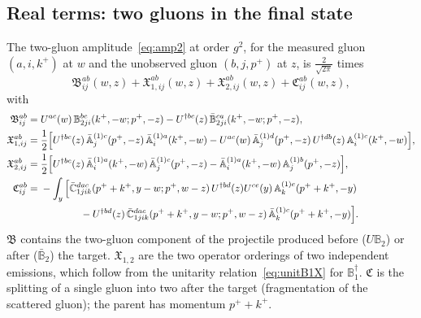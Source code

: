 \documentclass[aps,prd,onecolumn,superscriptaddress,nofootinbib,floatfix,longbibliography,11pt]{revtex4-2}
\numberwithin{equation}{section}
\def\mf#1{\mathbb{#1}}
\begin{document}
\subsection{Real terms: two gluons in the final state}\label{sec:groupII}

The two-gluon amplitude~\eqref{eq:amp2} at order $g^2$, for the measured gluon $(a,i,k^+)$ at $w$ and the unobserved gluon $(b,j,p^+)$ at $z$, is $\frac{2}{\sqrt{2\pi}}$ times
\begin{equation}
\mathfrak B^{ab}_{ij}(w,z)+\mathfrak X^{ab}_{1,ij}(w,z)+\mathfrak X^{ab}_{2,ij}(w,z)+\mathfrak C^{ab}_{ij}(w,z),
\label{eq:amp2NLO}
\end{equation}
with
\begin{align}
\mathfrak B^{ab}_{ij}={}&U^{ac}(w)\,\mf B^{bc}_{2ji}(k^+,-w;p^+,-z)-U^{\dagger bc}(z)\,\bar{\mf B}^{ca}_{2ji}(k^+,-w;p^+,-z),\label{eq:frakB}\\
\mathfrak X^{ab}_{1,ij}={}&\frac12\Big[U^{\dagger bc}(z)\,\bar{\mf A}^{(1)c}_j(p^+,-z)\,\bar{\mf A}^{(1)a}_i(k^+,-w)-U^{ac}(w)\,\bar{\mf A}^{(1)d}_j(p^+,-z)\,U^{\dagger db}(z)\,\mf A^{(1)c}_i(k^+,-w)\Big],\label{eq:frakX1}\\
\mathfrak X^{ab}_{2,ij}={}&\frac12\Big[U^{\dagger bc}(z)\,\bar{\mf A}^{(1)a}_i(k^+,-w)\,\bar{\mf A}^{(1)c}_j(p^+,-z)-\bar{\mf A}^{(1)a}_i(k^+,-w)\,\mf A^{(1)b}_j(p^+,-z)\Big],\label{eq:frakX2}\\
\mathfrak C^{ab}_{ij}={}&-\int_y\Big[\bar{\mf C}^{dac}_{1jik}(p^++k^+,y-w;p^+,w-z)\,U^{\dagger bd}(z)U^{ce}(y)\,\mf A^{(1)e}_k(p^++k^+,-y)\notag\\
&\hspace{4em}-U^{\dagger bd}(z)\,\bar{\mf C}^{dac}_{1jik}(p^++k^+,y-w;p^+,w-z)\,\bar{\mf A}^{(1)c}_k(p^++k^+,-y)\Big].\label{eq:frakC}
\end{align}
$\mathfrak B$ contains the two-gluon component of the projectile produced before ($U\mf B_2$) or after ($\bar{\mf B}_2$) the target. $\mathfrak X_{1,2}$ are the two operator orderings of two independent emissions, which follow from the unitarity relation~\eqref{eq:unitB1X} for $\mf B_1^\dagger$. $\mathfrak C$ is the splitting of a single gluon into two after the target (fragmentation of the scattered gluon); the parent has momentum $p^++k^+$.
\end{document}
